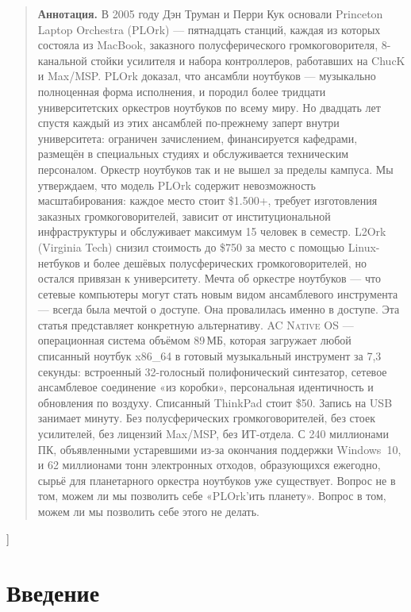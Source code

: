 \documentclass[10pt,letterpaper,twocolumn]{article}
\newcommand{\acos}{\textsc{AC Native OS}}
\begin{document}
{\begin{quote}
\small\noindent\textbf{Аннотация.}
В 2005 году Дэн Труман и Перри Кук основали Princeton Laptop Orchestra (PLOrk) --- пятнадцать станций, каждая из которых состояла из MacBook, заказного полусферического громкоговорителя, 8-канальной стойки усилителя и набора контроллеров, работавших на ChucK и Max/MSP. PLOrk доказал, что ансамбли ноутбуков --- музыкально полноценная форма исполнения, и породил более тридцати университетских оркестров ноутбуков по всему миру. Но двадцать лет спустя каждый из этих ансамблей по-прежнему заперт внутри университета: ограничен зачислением, финансируется кафедрами, размещён в специальных студиях и обслуживается техническим персоналом. Оркестр ноутбуков так и не вышел за пределы кампуса. Мы утверждаем, что модель PLOrk содержит невозможность масштабирования: каждое место стоит \$1.500+, требует изготовления заказных громкоговорителей, зависит от институциональной инфраструктуры и обслуживает максимум 15 человек в семестр. L2Ork (Virginia Tech) снизил стоимость до \$750 за место с помощью Linux-нетбуков и более дешёвых полусферических громкоговорителей, но остался привязан к университету. Мечта об оркестре ноутбуков --- что сетевые компьютеры могут стать новым видом ансамблевого инструмента --- всегда была мечтой о доступе. Она провалилась именно в доступе. Эта статья представляет конкретную альтернативу. \acos{} --- операционная система объёмом 89\,МБ, которая загружает любой списанный ноутбук x86\_64 в готовый музыкальный инструмент за 7,3 секунды: встроенный 32-голосный полифонический синтезатор, сетевое ансамблевое соединение «из коробки», персональная идентичность и обновления по воздуху. Списанный ThinkPad стоит \$50. Запись на USB занимает минуту. Без полусферических громкоговорителей, без стоек усилителей, без лицензий Max/MSP, без ИТ-отдела. С 240 миллионами ПК, объявленными устаревшими из-за окончания поддержки Windows~10, и 62 миллионами тонн электронных отходов, образующихся ежегодно, сырьё для планетарного оркестра ноутбуков уже существует. Вопрос не в том, можем ли мы позволить себе «PLOrk'ить планету». Вопрос в том, можем ли мы позволить себе этого не делать.
\end{quote}
\vspace{0.5em}
}]


\section{Введение}
\end{document}
